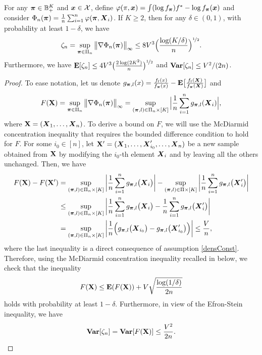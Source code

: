 \begin{prop}
	\label{boundEmpProcess}
	For any $\boldsymbol \pi\in{\mathbb B}^K_+$ and $\boldsymbol x\in\mathcal X$, define $\varphi(\pi,\boldsymbol x) = \int (\log f_{\boldsymbol \pi})f^* -\log f_{\boldsymbol \pi}(\boldsymbol x)$ and consider
	$\Phi_n(\boldsymbol \pi)=\frac1n\sum_{i=1}^n \varphi(\boldsymbol \pi,\boldsymbol X_i)$. If $K\ge 2$, then for any $\delta \in (0,1)$, with probability at
	least $1-\delta$, we have
	\begin{equation}
	\zeta_n=\sup_{\boldsymbol \pi\in\Pi_n}\big\| \nabla \Phi_n(\boldsymbol \pi)\big\|_\infty \leq 8V^3\Big(\frac{\log(K/\delta)}{n}\Big)^{\nicefrac12}.
	\end{equation}
	Furthermore, we have $\mathbf E[\zeta_n]\le 4V^3\big(\frac{2\log(2K^2)}{n}\big)^{\nicefrac12}$ and ${\bf Var}[\zeta_n]\le V^2/(2n)$.
\end{prop}
\begin{proof}
	To ease notation, let us denote $g_{\boldsymbol \pi,l}(x) = \frac{f_l(x)}{f_{\boldsymbol \pi}(x)}-
	\mathbf E\big[ \frac{f_l(\boldsymbol X)}{f_{\boldsymbol \pi}(\boldsymbol X)}\big]$ and
	\begin{equation}
	F(\mathbf X) = \sup_{\boldsymbol \pi\in\Pi_n}\big\| \nabla \Phi_n(\boldsymbol \pi)\big\|_\infty
	=\sup_{(\boldsymbol \pi,l)\in\Pi_n\times[K]}\Big|  \frac{1}{n}\sum_{i=1}^n g_{\boldsymbol \pi,l}(\boldsymbol X_i) \Big|,
	\end{equation}
	where $\mathbf X=(\boldsymbol X_1,\dots,\boldsymbol X_n)$.  To derive a bound on $F$, we will use the McDiarmid concentration
	inequality that requires the bounded difference condition to hold for $F$. For some $i_0\in[n]$, let
	$\mathbf X'=(\boldsymbol X_1,\dots,\boldsymbol X'_{i_0},\dots,\boldsymbol X_n)$  be a new sample obtained from $\mathbf X$ by modifying the
	$i_0$-th element $\boldsymbol X_i$ and by leaving all the others unchanged. Then, we have
	\begin{align}
	F(\mathbf X)-F(\mathbf X')
	&= \sup_{(\boldsymbol \pi,l)\in\Pi_n\times[K]} \bigg|  \frac{1}{n}\sum_{i=1}^n g_{\boldsymbol \pi,l}\big(\boldsymbol X_i\big) \bigg|-\sup_{(\boldsymbol \pi,l)\in\Pi\times[K]} \bigg|
	\frac{1}{n}\sum_{i=1}^n g_{\boldsymbol \pi,l}\big(\boldsymbol X'_i\big) \bigg|\\
	&\leq \sup_{(\boldsymbol \pi,l)\in\Pi_n\times[K]}  \bigg|\frac{1}{n}\sum_{i=1}^n g_{\boldsymbol \pi,l}\big(\boldsymbol X_i\big) - \frac{1}{n}\sum_{i=1}^n g_{\boldsymbol \pi,l}\big(\boldsymbol X'_i\big)  \bigg|\\
	&=\sup_{(\boldsymbol \pi,l)\in\Pi_n\times[K]} \bigg| \frac{1}{n}\Big(g_{\boldsymbol \pi,l}\big(\boldsymbol X_{i_0}\big) - g_{\boldsymbol \pi,l}\big(\boldsymbol X'_{i_0}\big)\Big) \bigg|
	\leq \frac{V}{n},
	\end{align}
	where the last inequality is a direct consequence of assumption \eqref{densConst}. Therefore, using the McDiarmid concentration inequality recalled
	in  below, we check that the inequality
	\begin{equation}
	\label{concIneqZ}
	F(\mathbf X) \leq \mathbf E(F(\mathbf X))+V\sqrt{\frac{\log(1/\delta)}{2n}}
	\end{equation}
	holds with probability at least $1-\delta$. Furthermore, in view of the Efron-Stein
	inequality, we have
	\begin{equation}
	\label{EfrStein}
	{\bf Var}[\zeta_n] = {\bf Var}[F(\mathbf X)] \leq \frac{V^2}{2n}.
	\end{equation}
	

\end{proof}
